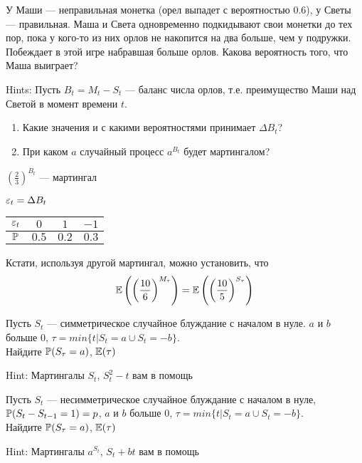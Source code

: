 \begin{problem}
У Маши — неправильная монетка (орел выпадет с вероятностью 0.6), у Светы — правильная. Маша и Света одновременно подкидывают свои монетки до тех пор, пока у кого-то из них орлов не накопится на два больше, чем у подружки. Побеждает в этой игре набравшая больше орлов. Какова вероятность того, что Маша выиграет?

Hints: Пусть $B_{t}=M_{t}-S_{t}$ — баланс числа орлов, т.е. преимущество Маши над Светой в момент времени $t$.
\begin{enumerate}
\item Какие значения и с какими вероятностями принимает $ \Delta B_{t} $?
\item При каком $ a $ случайный процесс $ a^{B_{t}} $ будет мартингалом?
\end{enumerate}


\begin{sol}
$ \left(\frac{2}{3}\right)^{B_{t}} $ — мартингал

$\e_t=\Delta B_t$

\begin{tabular}{cccc}
$\e_t$ & $0$ & $1$ & $-1$ \\
\hline
$\P$ & $0.5$ & $0.2$ & $0.3$ \\
\end{tabular}

Кстати, используя другой мартингал, можно установить, что
\[
\E\left( \left( \frac{10}{6} \right)^{M_{\tau}} \right) = \E\left( \left( \frac{10}{5} \right)^{S_{\tau}} \right)
\]

\end{sol}
\end{problem}

\begin{problem}
Пусть $S_{t}$ — симметрическое случайное блуждание с началом в нуле. $a$ и $b$ больше 0, $\tau=min\{t|S_{t}=a \cup S_{t}=-b\}$. \\
Найдите $\P(S_{\tau}=a)$, $\E(\tau)$

\begin{sol}

Hint: Мартингалы $S_{t}$, $S_{t}^2-t$ вам в помощь
\end{sol}
\end{problem}

\begin{problem}
Пусть $S_{t}$ — несимметрическое случайное блуждание с началом в нуле, $\P(S_{t}-S_{t-1}=1)=p$, $a$ и $b$ больше 0, $\tau=min\{t|S_{t}=a \cup S_{t}=-b\}$. \\
Найдите $\P(S_{\tau}=a)$, $\E(\tau)$

\begin{sol}

Hint: Мартингалы $a^{S_{t}}$, $S_{t}+bt$ вам в помощь
\end{sol}
\end{problem}

